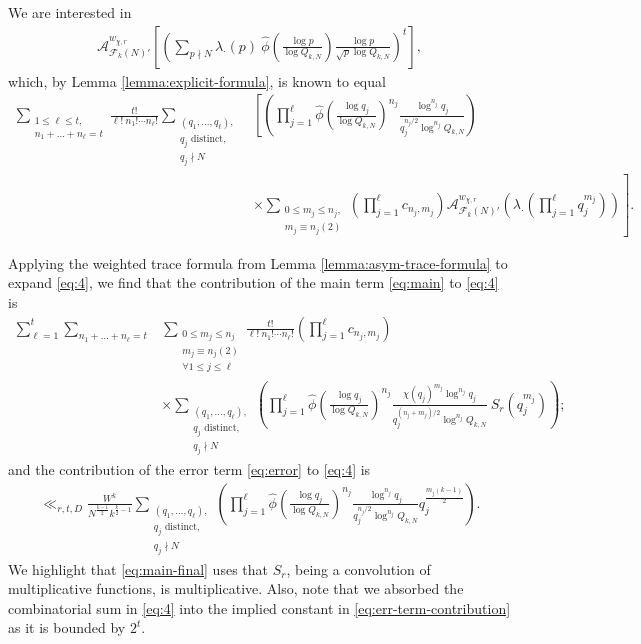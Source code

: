 \documentclass[12pt, reqno,oneside]{amsart}
\theoremstyle{plain}
\theoremstyle{definition}
\theoremstyle{remark}
\theoremstyle{plain}
\numberwithin{equation}{section}
\begin{document}
We are interested in
\begin{align}\label{eq:3'}
\mathcal{A}^{w_{\chi,r}}_{\mathcal{F}_k(N)'}\left[\left(\sum\nolimits_{p\nmid N}\lambda_\cdot(p) \ \widehat{\phi}\left(\frac{\log p}{\log Q_{k,N}}\right)\frac{\log p}{\sqrt{p}\log Q_{k,N}}\right)^t\right],
\end{align} 
which, by Lemma \ref{lemma:explicit-formula}, is known to equal
\begin{align}
\nonumber
\sum_{\substack{1\leq\ell\leq t, \\ n_1+\dots+n_\ell=t}}\frac{t!}{\ell! \ n_1!\cdots n_\ell!}\sum_{\substack{(q_1,\dots,q_\ell), \\ q_j \text{ distinct}, \\ q_j\nmid N}}&\left[\left(\prod_{j=1}^\ell\widehat{\phi}\left(\frac{\log q_j}{\log Q_{k,N}}\right)^{n_j}\frac{\log^{n_j} q_j}{q_j^{n_j/2}\log^{n_j} Q_{k,N}}\right)\right. \\ 
\label{eq:4}
&\left.\times\sum_{\substack{0\leq m_j\leq n_j, \\ m_j\equiv n_j(2)}}\left(\prod_{j=1}^\ell c_{n_j,m_j}\right)\mathcal{A}^{w_{\chi,r}}_{\mathcal{F}_k(N)'}\left(\lambda_\cdot\left(\prod\nolimits_{j=1}^\ell q_j^{m_j}\right)\right)\right].
\end{align}

Applying the weighted trace formula from Lemma \ref{lemma:asym-trace-formula} to expand \eqref{eq:4}, we find that the contribution of the main term \eqref{eq:main} to \eqref{eq:4} is
\begin{align}\nonumber
\sum_{\ell=1}^t\sum_{n_1+\dots+n_\ell=t}&\sum_{\substack{0\leq m_j\leq n_j\\ m_j\equiv n_j(2) \\ \forall1\leq j\leq\ell}}\frac{t!}{\ell! \ n_1!\cdots n_\ell!}\left(\prod_{j=1}^\ell c_{n_j,m_j}\right)\\
\label{eq:main-final}
&\times\sum_{\substack{(q_1,\dots,q_\ell), \\ q_j \text{ distinct}, \\ q_j\nmid N}}\left(\prod_{j=1}^\ell\widehat{\phi}\left(\frac{\log q_j}{\log Q_{k,N}}\right)^{n_j}\frac{\chi(q_j)^{m_j}\log^{n_j} q_j}{q_j^{(n_j+m_j)/2}\log^{n_j} Q_{k,N}} \ S_r\left(q_j^{m_j}\right)\right);
\end{align}
and the contribution of the error term \eqref{eq:error} to \eqref{eq:4} is 
\begin{align}\label{eq:err-term-contribution}
\ll_{r,t,D}\frac{W^k}{N^{\frac{k-1}{2}}k^{\frac{k}{2}-1}}\sum_{\substack{(q_1,\dots,q_\ell), \\ q_j \text{ distinct},  \\ q_j\nmid N}}\left(\prod_{j=1}^\ell\widehat{\phi}\left(\frac{\log q_j}{\log Q_{k,N}}\right)^{n_j}\frac{\log^{n_j} q_j}{q_j^{n_j/2}\log^{n_j} Q_{k,N}} q_j^{\frac{m_j(k-1)}{2}}\right).
\end{align}
We highlight that \eqref{eq:main-final} uses that $S_r$, being a convolution of multiplicative functions, is multiplicative. Also, note that we absorbed the combinatorial sum in \eqref{eq:4} into the implied constant in \eqref{eq:err-term-contribution} as it is bounded by $2^t$. 
\end{document}
